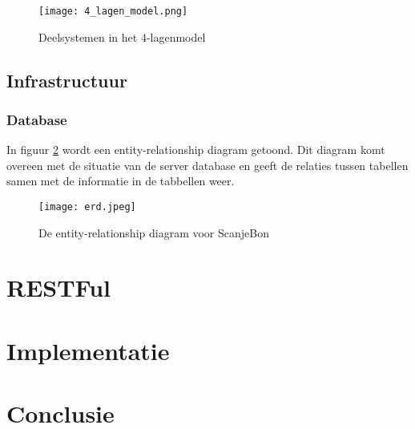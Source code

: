 \documentclass[a4paper,11pt,oneside]{report}
\begin{document}
\begin{figure}[ht!]
\centering
\texttt{[image: 4\_lagen\_model.png]}\\
\caption{Deelsystemen in het 4-lagenmodel}
\label{fig:vier_lagen_model}
\end{figure}

\section{Infrastructuur}
\subsection{Database}
\label{subsec:database}
In figuur \ref{fig:erd} wordt een entity-relationship diagram getoond. Dit
diagram komt overeen met de situatie van de server database en geeft de relaties
tussen tabellen samen met de informatie in de tabbellen weer.

\begin{figure}[ht!]
\centering
\texttt{[image: erd.jpeg]}\\
\caption{De entity-relationship diagram voor ScanjeBon}
\label{fig:erd}
\end{figure}

\chapter{RESTFul}



\chapter{Implementatie}











\chapter{Conclusie}




\appendix
\end{document}
